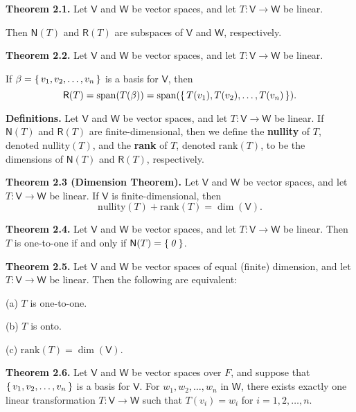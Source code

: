 \documentclass{article}
\newcommand{\0}{\mathit{0}}
\begin{document}
\medskip

\textbf{Theorem 2.1.} Let $\mathsf{V}$ and $\mathsf{W}$ be vector spaces, and let
$T: \mathsf{V} \to \mathsf{W}$ be linear.

Then $\mathsf{N}(T)$ and $\mathsf{R}(T)$ are subspaces of $\mathsf{V}$ and $\mathsf{W}$, respectively.

\medskip

\textbf{Theorem 2.2.} Let $\mathsf{V}$ and $\mathsf{W}$ be vector spaces, and let
$T: \mathsf{V} \to \mathsf{W}$ be linear.

If $\beta = \set{v_1, v_2, \dots, v_n}$ is a basis for $\mathsf{V}$, then
\[
    \mathsf{R}(T) = \mathrm{span}(T(\beta)) = \mathrm{span}(\set{T(v_1), T(v_2), \dots, T(v_n)}).
\]

\medskip

\textbf{Definitions.} Let $\mathsf{V}$ and $\mathsf{W}$ be vector spaces, and let
$T: \mathsf{V} \to \mathsf{W}$ be linear.
If $\mathsf{N}(T)$ and $\mathsf{R}(T)$ are finite-dimensional, then we define the
\textbf{nullity} of $T$, denoted $\mathrm{nullity}(T)$, and the \textbf{rank} of $T$,
denoted $\mathrm{rank}(T)$, to be the dimensions of $\mathsf{N}(T)$ and $\mathsf{R}(T)$, respectively.

\medskip

\textbf{Theorem 2.3 (Dimension Theorem).} Let $\mathsf{V}$ and $\mathsf{W}$ be vector spaces,
and let $T: \mathsf{V} \to \mathsf{W}$ be linear.
If $\mathsf{V}$ is finite-dimensional, then
\[
    \mathrm{nullity}(T) + \mathrm{rank}(T) = \dim(\mathsf{V}).
\]

\medskip

\textbf{Theorem 2.4.} Let $\mathsf{V}$ and $\mathsf{W}$ be vector spaces, and let
$T: \mathsf{V} \to \mathsf{W}$ be linear.
Then $T$ is one-to-one if and only if $\mathsf{N}(T) = \set{\0}$.

\medskip

\textbf{Theorem 2.5.} Let $\mathsf{V}$ and $\mathsf{W}$ be vector spaces of equal (finite)
dimension, and let $T: \mathsf{V} \to \mathsf{W}$ be linear. Then the following are equivalent:

(a) $T$ is one-to-one.

(b) $T$ is onto.

(c) $\mathrm{rank}(T) = \dim(\mathsf{V})$.

\medskip

\textbf{Theorem 2.6.} Let $\mathsf{V}$ and $\mathsf{W}$ be vector spaces over $F$, and suppose that
$\set{v_1, v_2, \dots, v_n}$ is a basis for $\mathsf{V}$.
For $w_1, w_2, \dots, w_n$ in $\mathsf{W}$, there exists exactly one linear transformation
$T: \mathsf{V} \to \mathsf{W}$ such that $T(v_i) = w_i$ for $i = 1, 2, \dots, n$.
\end{document}
